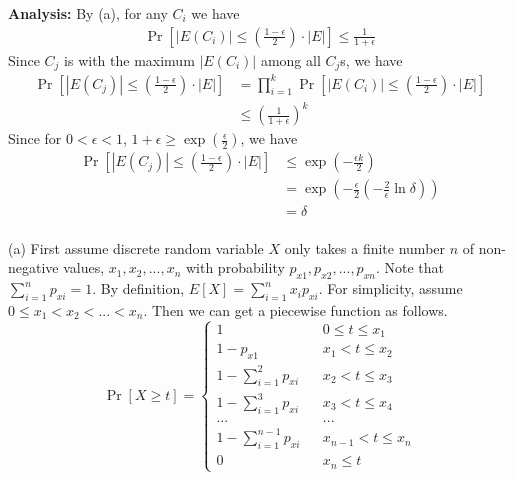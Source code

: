 \textbf{Analysis:}
By (a), for any $C_i$ we have
\begin{align}
    \nonumber \Pr[|E(C_i)|\le (\frac{1-\epsilon}{2})\cdot |E|]\le \frac{1}{1+\epsilon}
\end{align}
Since $C_j$ is with the maximum $|E(C_i)|$ among all $C_j$s, we have
\begin{align}
    \nonumber \Pr[|E(C_j)|\le (\frac{1-\epsilon}{2})\cdot |E|]&=\prod_{i=1}^k \Pr[|E(C_i)|\le (\frac{1-\epsilon}{2})\cdot |E|]\\
    \nonumber &\le (\frac{1}{1+\epsilon})^k
\end{align}
Since for $0< \epsilon <1$, $1+\epsilon \ge \exp({\frac{\epsilon}{2}})$, we have
\begin{align}
    \nonumber \Pr[|E(C_j)|\le (\frac{1-\epsilon}{2})\cdot |E|]&\le \exp({-\frac{\epsilon k}{2}})\\
    \nonumber&=\exp({-\frac{\epsilon}{2}(-\frac{2}{\epsilon}\ln \delta)})\\
    \nonumber&=\delta
\end{align}
\\
(a) 
First assume discrete random variable $X$ only takes a finite number $n$ of non-negative values, $x_1, x_2,...,x_n$ with probability $p_{x1},p_{x2},...,p_{xn}$. Note that $\sum_{i=1}^{n}p_{xi}=1$. 
By definition, $E[X]=\sum_{i=1}^{n}x_ip_{xi}$.
For simplicity, assume $0\le x_1< x_2 < ... < x_n$.
Then we can get a piecewise function as follows.
\begin{equation}
\nonumber \Pr[X\ge t]=\left\{
\begin{array}{rcl}
1 & & {0\le t \le x_1}\\
1-p_{x1} & & {x_1 < t \le x_2}\\
1-\sum_{i=1}^{2}p_{xi} & & {x_2 < t \le x_3}\\
1-\sum_{i=1}^{3}p_{xi} & & {x_3 < t \le x_4}\\
... & & ...\\
1-\sum_{i=1}^{n-1}p_{xi} & & {x_{n-1} < t \le x_n}\\
0 & & {x_n \le t}
\end{array} \right.
\end{equation}
